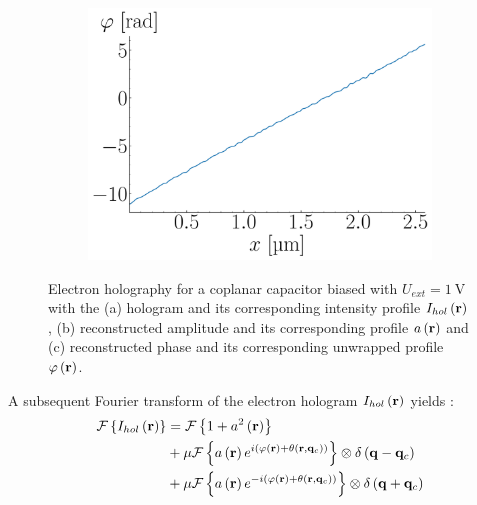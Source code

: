 \begin{figure}[H]
\begin{subfigure}[c]{0.3\textwidth}
		\label{fig:EH-AMP}
	\end{subfigure}%
	\hspace{4mm}
	\begin{subfigure}[c]{0.3\textwidth}
		\centering
		\includegraphics[width=\textwidth]{Figures/Holograms/EH_PH.pdf}
		\label{fig:EH-PH}
	\end{subfigure}%
	\caption{Electron holography for a coplanar capacitor biased with $U_{ext} = \SI{1}{\volt}$ with the (a) hologram and its corresponding intensity profile $I_{hol}\left(\vb{r}\right)$, (b) reconstructed amplitude and its corresponding profile $a\left(\vb{r}\right)$ and (c) reconstructed phase and its corresponding unwrapped profile $\varphi\left(\vb{r}\right)$.}
	\label{fig:EH-biased}
\end{figure}
A subsequent Fourier transform of the electron hologram $I_{hol}\left(\vb{r}\right)$ yields \cite{Lehmann1994,Voelkl1995}:
\begin{equation}
	\label{eq:FT-bands}
	\begin{split}
		\mathcal{F}\left\{ I_{hol}\left(\vb{r}\right) \right\} &= \mathcal{F}\left\{ 1 + a^2\left(\vb{r}\right) \right\} \\
		&+ \mu \mathcal{F}\left\{ a\left(\vb{r}\right)e^{i\left(\varphi\left(\vb{r}\right) + \theta\left(\vb{r},\vb{q}_c\right)\right)} \right\} \otimes \delta\left(\vb{q} - \vb{q}_c\right) \\
		&+ \mu \mathcal{F}\left\{ a\left(\vb{r}\right)e^{-i\left(\varphi\left(\vb{r}\right) + \theta\left(\vb{r},\vb{q}_c\right)\right)}\right\} \otimes \delta\left(\vb{q} + \vb{q}_c\right)
	\end{split}
\end{equation}
